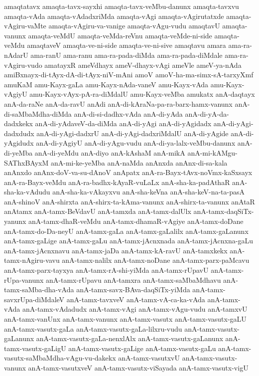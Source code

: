 {amaqtatavx
amaqta-tavx-sayxhi
amaqta-tavx-veMbu-danunx
amaqta-tavxvu
amaqta-vAda
amaqta-vAdadxriMda
amaqta-vAgi
amaqta-vAgirutatxde
amaqta-vAgiru-vaMte
amaqta-vAgiru-va-vanige
amaqta-vAgu-vudu
amaqtavU
amaqta-vanunx
amaqta-veMdU
amaqta-veMda-reVnu
amaqta-veMde-ni-side
amaqta-veMdu
amaqtaveV
amaqta-ve-ni-side
amaqta-ve-ni-sive
amaqtavu
amara
ama-ra-nAdarU
ama-ranU
ama-ranu
ama-ra-pada-diMda
ama-ra-pada-diMdale
ama-ra-vAgiru-vudo
amatayxR
ameVdhayx
ameV-dhayx-vAgi
ameVle
ameV-ya-nAda
amiBxnayx-di-tAyx-dA-di-tAyx-niV-mAni
amoV
amoV-ha-ma-simx-sA-tarxyXmf
amuKaM
amu-Kayx-gaLa
amu-Kayx-nAda-vaneV
amu-Kayx-vAda
amu-Kayx-vAgiyU
amu-Kayx-vAyx-pA-ra-diMdalU
amu-Kayx-veMba
amukatx
anA-daqtayx
anA-da-raNe
anA-da-ravU
anAdi
anA-di-kAraNa-pa-ra-barx-hamx-vanunx
anA-di-saMbaMdha-diMda
anA-di-si-dadhx-vAda
anA-di-yAda
anA-di-yA-da-dadxkekx
anA-di-yAdaveV-da-diMda
anA-di-yAgi
anA-di-yAgidadx
anA-di-yAgi-dadxdudx
anA-di-yAgi-dadxrU
anA-di-yAgi-dadxriMdalU
anA-di-yAgide
anA-di-yAgidudx
anA-di-yAgiyU
anA-di-yAgu-vudu
anA-di-ya-lalx-veMbu-danunx
anA-di-yeMba
anA-di-yeMdu
anA-diyo
anA-kAshaM
anA-mikA
anA-mi-kAMgu-SAThxBAyxM
anA-mi-ke-yeMba
anA-naMda
anAnxda
anAnx-di-sa-kala
anAnxdo
anAnx-doV-va-su-dAnoV
anApatx
anA-ra-Bayx-tAvx-noVmx-kaSxsayx
anA-ra-Bayx-veMdu
anA-ra-badhx-kAyaR-vuLaLx
anA-sha-ka-padAthaR
anA-sha-ka-vAdudu
anA-sha-ka-vAkayxvu
anA-sha-keVna
anA-sha-keV-na-ta-pasA
anA-shinoV
anA-shirxta
anA-shirx-ta-kAma-vanunx
anA-shirx-ta-vanunx
anAtaR
anAtamx
anA-tamx-BeVdavU
anA-tamxda
anA-tamx-dalUlx
anA-tamx-daqSiTx-yanunx
anA-tamx-dhaR-veMdu
anA-tamx-dhamaR-vAgiye
anA-tamx-doDane
anA-tamx-do-Da-neyU
anA-tamx-gaLa
anA-tamx-gaLalilx
anA-tamx-gaLanunx
anA-tamx-gaLige
anA-tamx-gaLu
anA-tamx-jAcnxnada
anA-tamx-jAcnxna-gaLu
anA-tamx-jAcnxnavu
anA-tamx-jaDa
anA-tamx-kA-ravU
anA-tamxkekx
anA-tamx-nAgiru-vavu
anA-tamx-nalilx
anA-tamx-noDane
anA-tamx-parx-paMcavu
anA-tamx-parx-tayxya
anA-tamx-rA-shi-yiMda
anA-tamx-rUpavU
anA-tamx-rUpa-vanunx
anA-tamx-rUpavu
anA-tamxra
anA-tamx-saMbaMdhavu
anA-tamx-saMba-dha-vAda
anA-tamx-savx-BAva-daqSiTx-yiMda
anA-tamx-savxrUpa-diMdaleV
anA-tamx-tavxveV
anA-tamx-vA-ca-ka-vAda
anA-tamx-vAda
anA-tamx-vAdadudx
anA-tamx-vAgi
anA-tamx-vAgu-vudu
anA-tamxvU
anA-tamx-vanUnx
anA-tamx-vanunx
anA-tamx-vasutx
anA-tamx-vasutx-gaLU
anA-tamx-vasutx-gaLa
anA-tamx-vasutx-gaLa-lilxru-vudu
anA-tamx-vasutx-gaLanunx
anA-tamx-vasutx-gaLa-nenxlAlx
anA-tamx-vasutx-gaLanunx
anA-tamx-vasutx-gaLigU
anA-tamx-vasutx-gaLige
anA-tamx-vasutx-gaLu
anA-tamx-vasutx-saMbaMdha-vAgu-vu-dakekx
anA-tamx-vasutxvU
anA-tamx-vasutx-vanunx
anA-tamx-vasutxveV
anA-tamx-vasutx-viSayada
anA-tamx-vasutx-vigU
}
